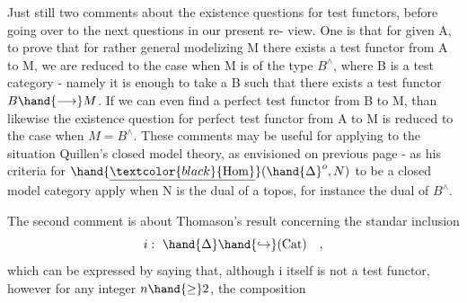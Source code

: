 Just still two comments about the existence questions for test
functors, before going over to the next questions in our present re-%
view. One is that for given A, to prove that for rather general
modelizing M there exists a test functor from A to M, we are reduced to
the case when M is of the type $B^{\wedge}$, where B is a test category - namely
it is enough to take a B such that there exists a test functor $B \hand{\longrightarrow} M$.
If we can even find a perfect test functor from  B to M, than likewise
the existence question for perfect test functor from A to M is reduced
to the case when $M = B^{\wedge}$. These comments may be useful for applying to
the situation Quillen's closed model theory, as envisioned on previous
page - as his criteria for $\hand{\underline{\textcolor{black}{\mathrm{Hom}}}}(\hand{\Delta}^{o}, N)$ to be a closed model category
apply when N is the dual of a topos, for instance the dual of $B^{\wedge}$.

The second comment is about Thomason's result concerning the standar
inclusion
\[ i:\ \hand{\Delta} \hand{\hookrightarrow} (\mathrm{Cat}) \quad , \]
which can be expressed by saying that, although i itself is not a \hand{\uline{\textcolor{black}{per-}}}%
\hand{\uline{\textcolor{black}{fect}}} test functor, however for any integer $n \hand{\geq} 2$, the composition
